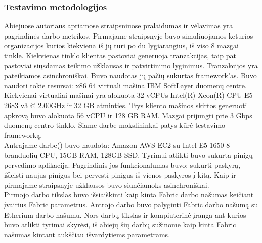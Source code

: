 \documentclass{VUMIFPSkursinis}
\begin{document}
		\subsubsection{Testavimo metodologijos}
			Abiejuose autoriaus apriamose straipsniuose pralaidumas ir vėlavimas yra pagrindinės darbo metrikos. Pirmajame straipsnyje \cite{IMBResearch}  buvo simuliuojamos keturios organizacijos kurios kiekviena iš jų turi po du lygiarangius, iš viso 8 mazgai tinkle. Kiekvienas tinklo klientas pastoviai generuoja tranzakcijas, taip pat pastoviai siųsdamas teikimo užklausas ir patvirtinimo lyginimus. Tranzakcijos yra pateikiamos asinchroniškai. Buvo naudotas jų pačių sukurtas framework'as. Buvo naudoti tokie resursai: x86 64 virtuali mašina IBM SoftLayer duomenų centre. Kiekvienai virtualiai mašinai yra alokuota 32 vCPUs  Intel(R) Xeon(R)
CPU E5-2683 v3 @ 2.00GHz ir 32 GB atminties.  Trys kliento mašinos skirtos generuoti apkrovą buvo alokuota
 56 vCPU ir 128 GB RAM. Mazgai prijungti prie 3 Gbps duomenų centro tinklo. Šiame darbe mokslininkai patys kūrė testavimo frameworką. \\
Antrajame darbe(\cite{ThailandPerf}) buvo naudota: Amazon AWS EC2
 su Intel E5-1650 8 branduolių CPU,
15GB RAM, 128GB SSD. Tyrimui atlikti buvo sukurta pinigų pervedimo aplikacija. Pagrindinis jos funkcionalumas buvo: sukurti paskyrą, išleisti naujus pinigus bei pervesti pinigus iš vienos paskyros į kitą. Kaip ir pirmajame straipsnyje užklausos buvo siunčiamoks asinchroniškai. \\
Pirmojo darbo \cite{IBMResearch} tikslas buvo išsiaiškinti kaip kinta Fabric darbo našumas keičiant įvairius Fabric parametrus. Antrojo darbo \cite{ThailandPerf} 
buvo palyginti Fabric darbo našumą su Etherium darbo našumu. Nors darbų tikslas ir kompiuterinė įranga ant kurios buvo atlikti tyrimai skyrėsi, iš abiejų šių 
darbų sužinome kaip kinta Fabric našumas kintant aukščiau išvardytiems parametrams.
\end{document}
